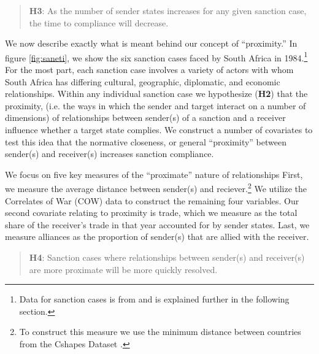 \begin{quote}
	\textbf{H3}: As the number of sender states increases for any given sanction case, the time to compliance will decrease. 
\end{quote}


 We now describe exactly what is meant behind our concept of ``proximity.'' In figure \ref{fig:saneti}, we show the six sanction cases faced by South Africa in 1984.\footnote{Data for sanction cases is from \citet{morgan2009threat} and is explained further in the following section.} For the most part, each sanction case involves a variety of actors with whom South Africa has differing cultural, geographic, diplomatic, and economic relationships. Within any individual sanction case we hypothesize (\textbf{H2}) that the proximity, (i.e. the ways in which the sender and target interact on a number of dimensions) of relationships between sender(s) of a sanction and a receiver influence whether a target state complies. We construct a number of covariates to test this idea that the normative closeness, or general ``proximity'' between sender(s) and receiver(s) increases sanction compliance. 

We focus on five key measures of the ``proximate'' nature of relationships First, we measure the average distance between sender(s) and reciever.\footnote{To construct this measure we use the minimum distance between countries from the Cshapes Dataset \citep{weidmann2010geography}.} We utilize the Correlates of War (COW) data to construct the remaining four variables. Our second covariate relating to proximity is trade, which we measure as the total share of the receiver's trade in that year accounted for by sender states. Last, we measure alliances as the proportion of sender(s) that are allied with the receiver. 

\begin{quote}
	\textbf{H4}: Sanction cases where relationships between sender(s) and receiver(s) are more proximate will be more quickly resolved.
\end{quote}



